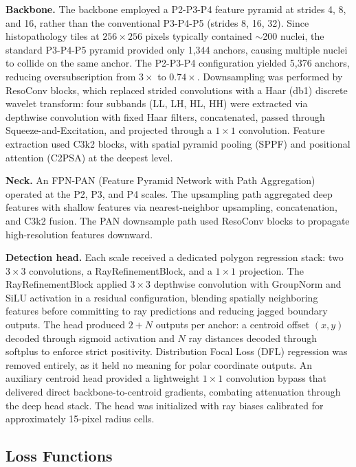 \documentclass[conference]{IEEEtran}
\begin{document}
\textbf{Backbone.} The backbone employed a P2-P3-P4 feature pyramid at strides 4, 8, and 16, rather than the conventional P3-P4-P5 (strides 8, 16, 32). Since histopathology tiles at $256 \times 256$ pixels typically contained $\sim$200 nuclei, the standard P3-P4-P5 pyramid provided only 1{,}344 anchors, causing multiple nuclei to collide on the same anchor. The P2-P3-P4 configuration yielded 5{,}376 anchors, reducing oversubscription from $3\times$ to $0.74\times$. Downsampling was performed by ResoConv blocks, which replaced strided convolutions with a Haar (db1) discrete wavelet transform: four subbands (LL, LH, HL, HH) were extracted via depthwise convolution with fixed Haar filters, concatenated, passed through Squeeze-and-Excitation, and projected through a $1 \times 1$ convolution. Feature extraction used C3k2 blocks, with spatial pyramid pooling (SPPF) and positional attention (C2PSA) at the deepest level.

\textbf{Neck.} An FPN-PAN (Feature Pyramid Network with Path Aggregation) operated at the P2, P3, and P4 scales. The upsampling path aggregated deep features with shallow features via nearest-neighbor upsampling, concatenation, and C3k2 fusion. The PAN downsample path used ResoConv blocks to propagate high-resolution features downward.

\textbf{Detection head.} Each scale received a dedicated polygon regression stack: two $3 \times 3$ convolutions, a RayRefinementBlock, and a $1 \times 1$ projection. The RayRefinementBlock applied $3 \times 3$ depthwise convolution with GroupNorm and SiLU activation in a residual configuration, blending spatially neighboring features before committing to ray predictions and reducing jagged boundary outputs. The head produced $2 + N$ outputs per anchor: a centroid offset $(x, y)$ decoded through sigmoid activation and $N$ ray distances decoded through softplus to enforce strict positivity. Distribution Focal Loss (DFL) regression was removed entirely, as it held no meaning for polar coordinate outputs. An auxiliary centroid head provided a lightweight $1 \times 1$ convolution bypass that delivered direct backbone-to-centroid gradients, combating attenuation through the deep head stack. The head was initialized with ray biases calibrated for approximately 15-pixel radius cells.

\subsection{Loss Functions}
\end{document}
